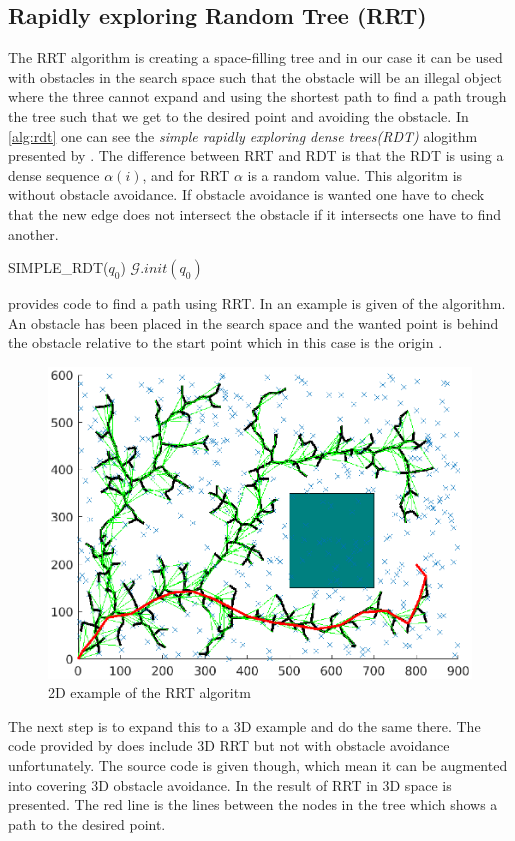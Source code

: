 \subsection{Rapidly exploring Random Tree (RRT)}
The RRT algorithm is creating a space-filling tree and in our case it can be used with obstacles in the search space such that the obstacle will be an illegal object where the three cannot expand and using the shortest path to find a path trough the tree such that we get to the desired point and avoiding the obstacle. In \autoref{alg:rdt} one can see the \textit{simple rapidly exploring dense trees(RDT)} alogithm presented by \cite{Lavalle}. The difference between RRT and RDT is that the RDT is using a dense sequence $\alpha(i)$, and for RRT $\alpha$ is a random value. This algoritm is without obstacle avoidance. If obstacle avoidance is wanted one have to check that the new edge does not intersect the obstacle if it intersects one have to find another. 
\begin{algorithm}[htbp]
 SIMPLE\_RDT($q_0$)\;
 $\mathcal{G}.init(q_0)$
 \caption{}
 \label{alg:rdt}
\end{algorithm}
\cite{rrt} provides code to find a path using RRT. In  an example is given of the algorithm. An obstacle has been placed in the search space and the wanted point is behind the obstacle relative to the start point which in this case is the origin \cite{rrt}.
\begin{figure}[htbp]
  \centering
  \includegraphics[width=.9\textwidth]{img/rrt2dex.eps}
  \caption{2D example of the RRT algoritm}
  \label{fig:rrt2dex}
\end{figure}
The next step is to expand this to a 3D example and do the same there. The code provided by \cite{rrt} does include 3D RRT but not with obstacle avoidance unfortunately. The source code is given though, which mean it can be augmented into covering 3D obstacle avoidance. In  the result of RRT in 3D space is presented. The red line is the lines between the nodes in the tree which shows a path to the desired point. 

